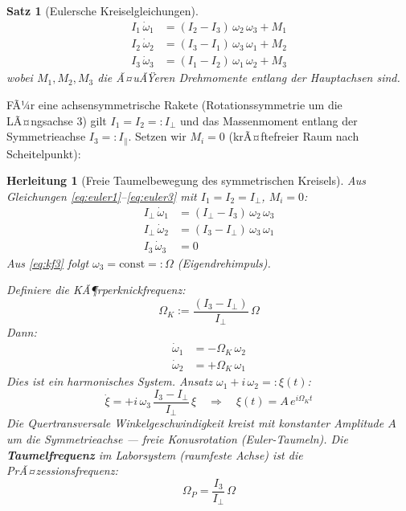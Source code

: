 ﻿\documentclass[12pt,a4paper]{article}
\newtheorem{satz}{Satz}[section]
\newtheorem{herleitung}{Herleitung}[section]
\begin{document}
\begin{satz}[Eulersche Kreiselgleichungen]
\begin{align}
  I_1\,\dot{\omega}_1 &= (I_2 - I_3)\,\omega_2\,\omega_3 + M_1
  \label{eq:euler1}\\
  I_2\,\dot{\omega}_2 &= (I_3 - I_1)\,\omega_3\,\omega_1 + M_2
  \label{eq:euler2}\\
  I_3\,\dot{\omega}_3 &= (I_1 - I_2)\,\omega_1\,\omega_2 + M_3
  \label{eq:euler3}
\end{align}
wobei $M_1, M_2, M_3$ die Ã¤uÃŸeren Drehmomente entlang der Hauptachsen sind.
\end{satz}

FÃ¼r eine achsensymmetrische Rakete (Rotationssymmetrie um die LÃ¤ngsachse 3) gilt
$I_1 = I_2 =: I_\perp$ und das Massenmoment entlang der Symmetrieachse
$I_3 =: I_\parallel$. Setzen wir $M_i = 0$ (krÃ¤ftefreier Raum nach Scheitelpunkt):

\begin{herleitung}[Freie Taumelbewegung des symmetrischen Kreisels]
Aus Gleichungen \eqref{eq:euler1}--\eqref{eq:euler3} mit $I_1=I_2=I_\perp$, $M_i=0$:
\begin{align}
  I_\perp\,\dot{\omega}_1 &= (I_\perp - I_3)\,\omega_2\,\omega_3 \label{eq:kf1}\\
  I_\perp\,\dot{\omega}_2 &= (I_3 - I_\perp)\,\omega_3\,\omega_1 \label{eq:kf2}\\
  I_3\,\dot{\omega}_3     &= 0 \label{eq:kf3}
\end{align}
Aus \eqref{eq:kf3} folgt $\omega_3 = \mathrm{const} =: \Omega$ (Eigendrehimpuls).

Definiere die \emph{KÃ¶rperknickfrequenz}:
\[
  \Omega_K := \frac{(I_3 - I_\perp)}{{I_\perp}}\,\Omega
\]
Dann:
\begin{align}
  \dot{\omega}_1 &= -\Omega_K\,\omega_2 \label{eq:harm1}\\
  \dot{\omega}_2 &= +\Omega_K\,\omega_1 \label{eq:harm2}
\end{align}
Dies ist ein harmonisches System. Ansatz $\omega_1 + i\,\omega_2 =: \xi(t)$:
\[
  \dot{\xi} = +i\,\omega_3\,\frac{I_3-I_\perp}{I_\perp}\,\xi
  \quad\Rightarrow\quad
  \xi(t) = A\,e^{i\Omega_K t}
\]
Die Quertransversale Winkelgeschwindigkeit \emph{kreist mit konstanter Amplitude $A$}
um die Symmetrieachse --- freie Konusrotation (Euler-Taumeln). Die
\textbf{Taumelfrequenz} im Laborsystem (raumfeste Achse) ist die
\emph{PrÃ¤zessionsfrequenz}:
\[
  \boxed{\Omega_P = \frac{I_3}{I_\perp}\,\Omega}
\]
\end{herleitung}
\end{document}
